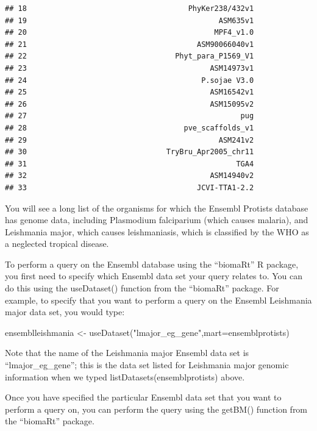 \documentclass[
]{book}
\newenvironment{Shaded}{\begin{snugshade}}{\end{snugshade}}
\newcommand{\AttributeTok}[1]{\textcolor[rgb]{0.77,0.63,0.00}{#1}}
\newcommand{\FunctionTok}[1]{\textcolor[rgb]{0.00,0.00,0.00}{#1}}
\newcommand{\NormalTok}[1]{#1}
\newcommand{\OtherTok}[1]{\textcolor[rgb]{0.56,0.35,0.01}{#1}}
\newcommand{\StringTok}[1]{\textcolor[rgb]{0.31,0.60,0.02}{#1}}
\begin{document}
\begin{verbatim}
## 18                                     PhyKer238/432v1
## 19                                            ASM635v1
## 20                                           MPF4_v1.0
## 21                                       ASM90066040v1
## 22                                  Phyt_para_P1569_V1
## 23                                          ASM14973v1
## 24                                        P.sojae V3.0
## 25                                          ASM16542v1
## 26                                          ASM15095v2
## 27                                                 pug
## 28                                    pve_scaffolds_v1
## 29                                            ASM241v2
## 30                                TryBru_Apr2005_chr11
## 31                                                TGA4
## 32                                          ASM14940v2
## 33                                       JCVI-TTA1-2.2
\end{verbatim}

You will see a long list of the organisms for which the Ensembl Protists database has genome data, including Plasmodium falciparium (which causes malaria), and Leishmania major, which causes leishmaniasis, which is classified by the WHO as a neglected tropical disease.

To perform a query on the Ensembl database using the ``biomaRt'' R package, you first need to specify which Ensembl data set your query relates to. You can do this using the useDataset() function from the ``biomaRt'' package. For example, to specify that you want to perform a query on the Ensembl Leishmania major data set, you would type:

\begin{Shaded}
\begin{Highlighting}[]
\NormalTok{ensemblleishmania }\OtherTok{\textless{}{-}} \FunctionTok{useDataset}\NormalTok{(}\StringTok{"lmajor\_eg\_gene"}\NormalTok{,}\AttributeTok{mart=}\NormalTok{ensemblprotists)}
\end{Highlighting}
\end{Shaded}

Note that the name of the Leishmania major Ensembl data set is ``lmajor\_eg\_gene''; this is the data set listed for Leishmania major genomic information when we typed listDatasets(ensemblprotists) above.

Once you have specified the particular Ensembl data set that you want to perform a query on, you can perform the query using the getBM() function from the ``biomaRt'' package.
\end{document}
